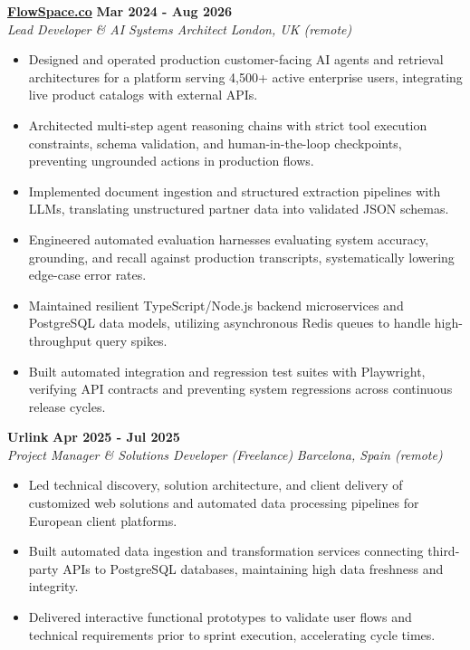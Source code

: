 \documentclass[10pt,a4paper]{article}
\newcommand{\role}[4]{%
  \textbf{#1} \hfill \textbf{#2}\\[1pt]%
  \textit{#3} \hfill \textit{#4}\\[2pt]%
}
\begin{document}
\role{\href{https://flowspace.co}{FlowSpace.co}}{Mar 2024 - Aug 2026}{Lead Developer \& AI Systems Architect}{London, UK (remote)}
\begin{itemize}
  \item Designed and operated production customer-facing AI agents and retrieval architectures for a platform serving 4,500+ active enterprise users, integrating live product catalogs with external APIs.
  \item Architected multi-step agent reasoning chains with strict tool execution constraints, schema validation, and human-in-the-loop checkpoints, preventing ungrounded actions in production flows.
  \item Implemented document ingestion and structured extraction pipelines with LLMs, translating unstructured partner data into validated JSON schemas.
  \item Engineered automated evaluation harnesses evaluating system accuracy, grounding, and recall against production transcripts, systematically lowering edge-case error rates.
  \item Maintained resilient TypeScript/Node.js backend microservices and PostgreSQL data models, utilizing asynchronous Redis queues to handle high-throughput query spikes.
  \item Built automated integration and regression test suites with Playwright, verifying API contracts and preventing system regressions across continuous release cycles.
\end{itemize}

\role{Urlink}{Apr 2025 - Jul 2025}{Project Manager \& Solutions Developer (Freelance)}{Barcelona, Spain (remote)}
\begin{itemize}
  \item Led technical discovery, solution architecture, and client delivery of customized web solutions and automated data processing pipelines for European client platforms.
  \item Built automated data ingestion and transformation services connecting third-party APIs to PostgreSQL databases, maintaining high data freshness and integrity.
  \item Delivered interactive functional prototypes to validate user flows and technical requirements prior to sprint execution, accelerating cycle times.
\end{itemize}
\end{document}
